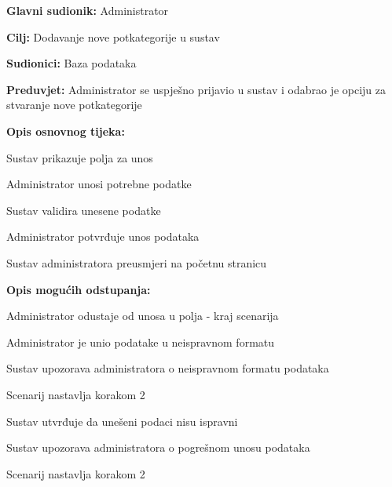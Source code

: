 					\noindent {}
					\begin{packed_item}
	
						\item \textbf{Glavni sudionik: }Administrator
						\item  \textbf{Cilj:} Dodavanje nove potkategorije u sustav
						\item  \textbf{Sudionici:} Baza podataka
						\item  \textbf{Preduvjet:} Administrator se uspješno prijavio u sustav i odabrao je opciju za stvaranje nove potkategorije
						\item  \textbf{Opis osnovnog tijeka:}
						
						\item[] \begin{packed_enum}
							\item Sustav prikazuje polja za unos
							\item Administrator unosi potrebne podatke
							\item Sustav validira unesene podatke
							\item Administrator potvrđuje unos podataka
							\item Sustav administratora preusmjeri na početnu stranicu
						\end{packed_enum}
						\item  \textbf{Opis mogućih odstupanja:}

						\item[] \begin{packed_item}
							\item[2.a] Administrator odustaje od unosa u polja - kraj scenarija
							\item[3.a] Administrator je unio podatake u neispravnom formatu
							\item[] \begin{packed_enum}
								\item Sustav upozorava administratora o neispravnom formatu podataka
								\item Scenarij nastavlja korakom 2 
							\end{packed_enum}	
							\item[5.a] Sustav utvrđuje da unešeni podaci nisu ispravni
							\item[] \begin{packed_enum}
								\item Sustav upozorava administratora o pogrešnom unosu podataka
								\item Scenarij nastavlja korakom 2 
							\end{packed_enum}					
						\end{packed_item}
					\end{packed_item}

